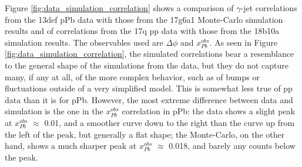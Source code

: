 Figure \ref{fig:data_simulation_correlation} shows a comparison of $\gamma$-jet correlations from the 13def pPb data with those from the 17g6a1 Monte-Carlo simulation results and of correlations from the 17q pp data with those from the 18b10a simulation results. The observables used are $\Delta \phi$ and $x^{obs}_{Pb}$. As seen in Figure \ref{fig:data_simulation_correlation}, the simulated correlations bear a resemblance to the general shape of the simulations from the data, but they do not capture many, if any at all, of the more complex behavior, such as of bumps or fluctuations outside of a very simplified model. This is somewhat less true of pp data than it is for pPb. However, the most extreme difference between data and simulation is the one in the $x^{obs}_{Pb}$ correlation in pPb: the data shows a slight peak at $x^{obs}_{Pb}$ $\approx$ 0.01, and a smoother curve down to the right than the curve up from the left of the peak, but generally a flat shape; the Monte-Carlo, on the other hand, shows a much sharper peak at $x^{obs}_{Pb}$ $\approx$ 0.018, and barely any counts below the peak.

